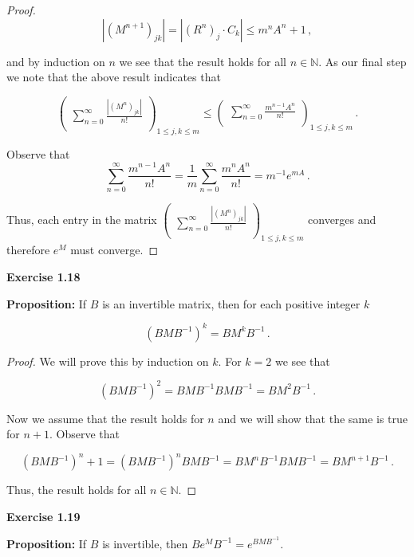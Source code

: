\documentclass[a4paper]{article}
\newcommand {\m} {\cdot}
\numberwithin{equation}{section}
\begin{document}
\begin{description}
\begin{proof}
$$|(M^{n+1})_{jk}| = |(R^n)_j \m C_k| \leq m^{n}A^n+1\,,$$

and by induction on $n$ we see that the result holds for all $n \in \mathbb{N}$. As our final step we note that the above result indicates that

$$\begin{pmatrix}
\sum_{n=0}^{\infty}\frac{|(M^n)_{jk}|}{n!}\\
\end{pmatrix}_{1\leq j,k \leq m} \leq 
\begin{pmatrix}
\sum_{n=0}^{\infty}\frac{m^{n-1}A^n}{n!}\\
\end{pmatrix}_{1\leq j,k \leq m}\,.$$

Observe that 
$$\sum_{n=0}^{\infty}\frac{m^{n-1}A^n}{n!} = \frac{1}{m}\sum_{n=0}^{\infty}\frac{m^{n}A^n}{n!} = m^{-1}e^{mA}\,.$$

Thus, each entry in the matrix $\begin{pmatrix}
\sum_{n=0}^{\infty}\frac{|(M^n)_{jk}|}{n!}\\
\end{pmatrix}_{1\leq j,k \leq m}$ converges and therefore $e^M$ must converge.

\end{proof}

\item \textbf{Exercise 1.18}

\item \textbf{Proposition: }If $B$ is an invertible matrix, then for each positive integer $k$ 

$$(BMB^{-1})^k = BM^kB^{-1}\,.$$

\begin{proof} We will prove this by induction on $k$. For $k = 2$ we see that

$$(BMB^{-1})^2 = BMB^{-1}BMB^{-1} = BM^2B^{-1}\,.$$

Now we assume that the result holds for $n$ and we will show that the same is true for $n+1$. Observe that 

$$(BMB^{-1})^n+1 = (BMB^{-1})^nBMB^{-1} = BM^nB^{-1}BMB^{-1} = BM^{n+1}B^{-1}\,.$$

Thus, the result holds for all $n \in \mathbb{N}$.

\end{proof}

\item \textbf{Exercise 1.19}

\item \textbf{Proposition: } If $B$ is invertible, then $Be^{M}B^{-1} = e^{BMB^{-1}}$.


\end{description}
\end{document}
